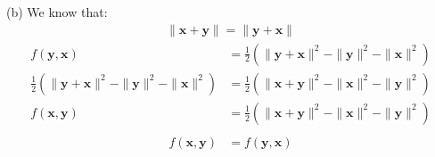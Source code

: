 \documentclass[a4paper,12pt]{article}
\begin{document}
(b) 
We know that:
\begin{align}
    \|\bm{x} + \bm{y}\| = \|\bm{y} + \bm{x}\|
\end{align}
\begin{align*}
    f(\bm{y},\bm{x}) &= \frac 1 2 (\|\bm{y} + \bm{x}\|^2 - \|\bm{y}\|^2 - \|\bm{x}\|^2)  \\
    \frac 1 2 (\|\bm{y} + \bm{x}\|^2 - \|\bm{y}\|^2 - \|\bm{x}\|^2) &= \frac 1 2(\|\bm{x} + \bm{y}\|^2 - \|\bm{x}\|^2 - \|\bm{y}\|^2) \\
    f(\bm{x}, \bm{y}) &= \frac 1 2 (\|\bm{x} + \bm{y}\|^2 - \|\bm{x}\|^2 - \|\bm{y}\|^2) \\
\end{align*}
\begin{align}
    f(\bm{x}, \bm{y}) &= f(\bm{y}, \bm{x})
\end{align}
\end{document}
